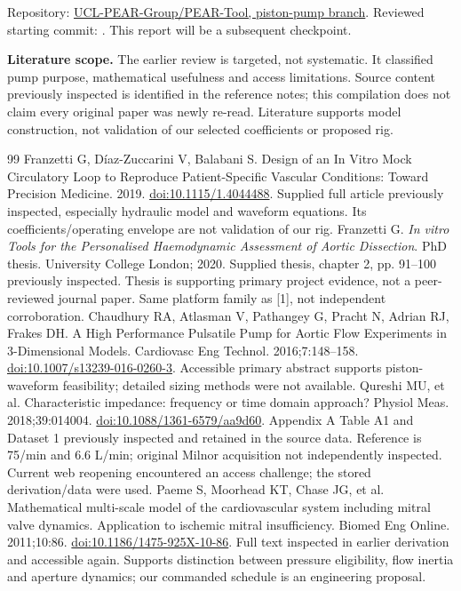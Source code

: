 \documentclass[11pt,a4paper]{article}
\numberwithin{equation}{section}
\begin{document}
Repository: \href{https://github.com/UCL-PEAR-Group/PEAR-Tool/tree/v1-prototype-design-1-piston-pump}{UCL-PEAR-Group/PEAR-Tool, piston-pump branch}. Reviewed starting commit: . This report will be a subsequent checkpoint.

\textbf{Literature scope.} The earlier review is targeted, not systematic. It classified pump purpose, mathematical usefulness and access limitations. Source content previously inspected is identified in the reference notes; this compilation does not claim every original paper was newly re-read. Literature supports model construction, not validation of our selected coefficients or proposed rig.

\clearpage{}
\begin{thebibliography}{99}\small
{} Franzetti G, D\'iaz-Zuccarini V, Balabani S. Design of an In Vitro Mock Circulatory Loop to Reproduce Patient-Specific Vascular Conditions: Toward Precision Medicine. 2019. \href{https://doi.org/10.1115/1.4044488}{doi:10.1115/1.4044488}. Supplied full article previously inspected, especially hydraulic model and waveform equations. Its coefficients/operating envelope are not validation of our rig.
 Franzetti G. \emph{In vitro Tools for the Personalised Haemodynamic Assessment of Aortic Dissection}. PhD thesis. University College London; 2020. Supplied thesis, chapter 2, pp. 91--100 previously inspected. Thesis is supporting primary project evidence, not a peer-reviewed journal paper. Same platform family as [1], not independent corroboration.
 Chaudhury RA, Atlasman V, Pathangey G, Pracht N, Adrian RJ, Frakes DH. A High Performance Pulsatile Pump for Aortic Flow Experiments in 3-Dimensional Models. Cardiovasc Eng Technol. 2016;7:148--158. \href{https://doi.org/10.1007/s13239-016-0260-3}{doi:10.1007/s13239-016-0260-3}. Accessible primary abstract supports piston-waveform feasibility; detailed sizing methods were not available.
 Qureshi MU, et al. Characteristic impedance: frequency or time domain approach? Physiol Meas. 2018;39:014004. \href{https://doi.org/10.1088/1361-6579/aa9d60}{doi:10.1088/1361-6579/aa9d60}. Appendix A Table A1 and Dataset 1 previously inspected and retained in the source data. Reference is 75/min and 6.6 L/min; original Milnor acquisition not independently inspected. Current web reopening encountered an access challenge; the stored derivation/data were used.
 Paeme S, Moorhead KT, Chase JG, et al. Mathematical multi-scale model of the cardiovascular system including mitral valve dynamics. Application to ischemic mitral insufficiency. Biomed Eng Online. 2011;10:86. \href{https://doi.org/10.1186/1475-925X-10-86}{doi:10.1186/1475-925X-10-86}. Full text inspected in earlier derivation and accessible again. Supports distinction between pressure eligibility, flow inertia and aperture dynamics; our commanded schedule is an engineering proposal.

\end{thebibliography}
\end{document}
